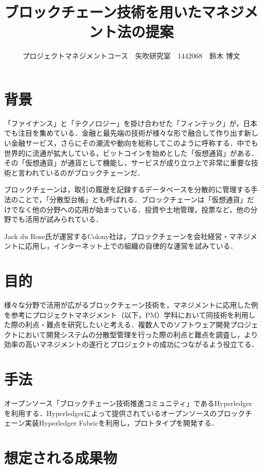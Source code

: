 \documentclass[uplatex,twocolumn,dvipdfmx]{jsarticle}
\title{\vspace{-5mm}\fontsize{14pt}{0pt}\selectfont ブロックチェーン技術を用いたマネジメント法の提案}
\author{\normalsize プロジェクトマネジメントコース　矢吹研究室　1442068　鈴木 博文}
\date{}
\begin{document}
\fontsize{10.5pt}{\baselineskip}\selectfont
\maketitle





\section{背景}

「ファイナンス」と「テクノロジー」を掛け合わせた「フィンテック」が，日本でも注目を集めている．金融と最先端の技術が様々な形で融合して作り出す新しい金融サービス，さらにその潮流や動向を総称してこのように呼称する\cite{fujitsu}．中でも世界的に流通が拡大している，ビットコインを始めとした「仮想通貨」がある．その「仮想通貨」が通貨として機能し，サービスが成り立つ上で非常に重要な技術と言われているのがブロックチェーンだ．

ブロックチェーンは，取引の履歴を記録するデータベースを分散的に管理する手法のことで，「分散型台帳」とも呼ばれる．ブロックチェーンは「仮想通貨」だけでなく他の分野への応用が始まっている．投資や土地管理，投票など，他の分野でも活用が試みられている．

Jack du Rose氏が運営するColony社は，ブロックチェーンを会社経営・マネジメントに応用し，インターネット上での組織の自律的な運営を試みている\cite{wired}．

\section{目的}

様々な分野で活用が広がるブロックチェーン技術を，マネジメントに応用した例を参考にプロジェクトマネジメント（以下，PM）学科において同技術を利用した際の利点・難点を研究したいと考える．複数人でのソフトウェア開発プロジェクトにおいて開発システムの分散型管理を行った際の利点と難点を調査し，より効率の高いマネジメントの遂行とプロジェクトの成功につながるよう役立てる．

\section{手法}

オープンソース「ブロックチェーン技術推進コミュニティ」であるHyperledgerを利用する．Hyperledgerによって提供されているオープンソースのブロックチェーン実装Hyperledger Fabricを利用し，プロトタイプを開発する．

\section{想定される成果物}
\end{document}

